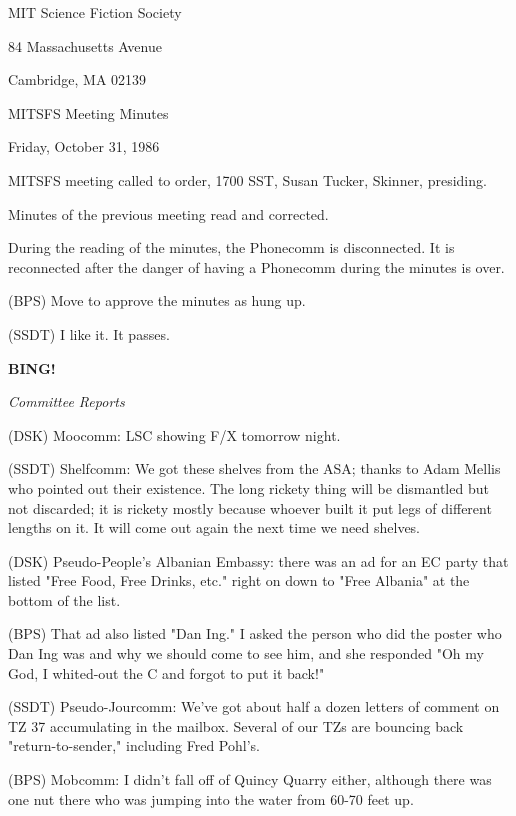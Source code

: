 \documentclass[12pt]{article}
\newcommand{\bing}{{\bf BING!} }
\newcommand{\goto}[1]{\bing \vskip 12pt \centerline{{\em{#1}}}}
\begin{document}
\begin{center}

MIT Science Fiction Society 

84 Massachusetts Avenue

Cambridge, MA 02139

\vspace{12pt}

MITSFS Meeting Minutes 

Friday, October 31, 1986

\end{center}
 
\vspace{18pt}

\setlength{\parskip}{6pt}

\noindent
MITSFS meeting called to order, 1700 SST,
Susan Tucker, Skinner, presiding.

Minutes of the previous meeting read and corrected.

During the reading of the minutes, the Phonecomm is disconnected. It is reconnected after the danger of having a Phonecomm during the minutes is over.

(BPS) Move to approve the minutes as hung up.

(SSDT) I like it. It passes.

\goto{Committee Reports}

(DSK) Moocomm: LSC showing F/X tomorrow night.

(SSDT) Shelfcomm: We got these shelves from the ASA; thanks to Adam Mellis who pointed out their existence. The long rickety thing will be dismantled but not discarded; it is rickety mostly because whoever built it put legs of different lengths on it. It will come out again the next time we need shelves.

(DSK) Pseudo-People's Albanian Embassy: there was an ad for an EC party that listed "Free Food, Free Drinks, etc." right on down to "Free Albania" at the bottom of the list.

(BPS) That ad also listed "Dan Ing." I asked the person who did the poster who Dan Ing was and why we should come to see him, and she responded "Oh my God, I whited-out the C and forgot to put it back!"

(SSDT) Pseudo-Jourcomm: We've got about half a dozen letters of comment on TZ 37 accumulating in the mailbox. Several of our TZs are bouncing back "return-to-sender," including Fred Pohl's.

(BPS) Mobcomm: I didn't fall off of Quincy Quarry either, although there was one nut there who was jumping into the water from 60-70 feet up.
\end{document}
